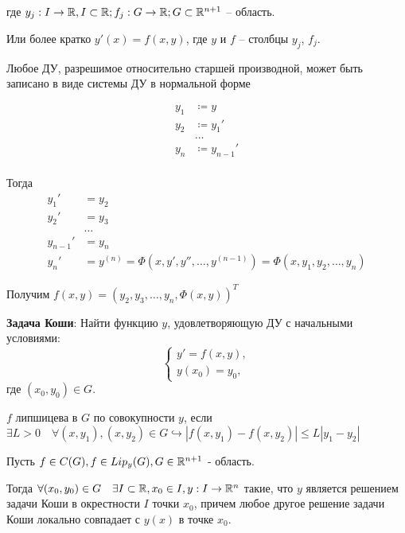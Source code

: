 где $y_j: I \rightarrow \mathbb{R}, I \subset \mathbb{R}; f_j: G \rightarrow \mathbb{R}; G \subset \mathbb{R}^{n+1}$ -- область.

Или более кратко $y'(x) = f(x, y)$, где $y$ и $f$ -- столбцы $y_j$, $f_j$.

\Statement Любое ДУ, разрешимое относительно старшей производной, может быть записано в виде системы ДУ в нормальной форме

\Proof

\begin{align*}
    y_1 &\coloneqq y \\
    y_2 &\coloneqq y_1' \\
    &\dots \\
    y_n &\coloneqq y_ {n-1}' \\
\end{align*}

Тогда
\begin{align*}
    y_1' &= y_2 \\
    y_2' &= y_3 \\
    &\dots \\
    y_{n-1}' &= y_n \\
    y_n' &= y^{(n)} = \Phi(x, y', y'', \dots, y^{(n-1)}) = \Phi(x, y_1, y_2, \dots, y_n)
\end{align*}

Получим $f(x, y) = (y_2, y_3, \dots, y_n, \Phi(x, y))^T$

\Endproof

\Def \textbf{Задача Коши}: Найти функцию $y$, удовлетворяющую ДУ с начальными условиями:
\begin{equation*}
    \begin{cases}
        y' = f(x, y), \\
        y(x_0) = y_0,
    \end{cases}
\end{equation*}
где $(x_0, y_0) \in G$.

\Def $f$ липшицева в $G$ по совокупности $y$, если $\exists L > 0\quad\forall (x, y_1), (x, y_2) \in G \hookrightarrow |f(x, y_1) - f(x, y_2)| \leq L |y_1 - y_2|$


Пусть $f \in C(G), f \in Lip_y(G), G \in \mathbb{R}^{n+1}$ - область.

Тогда $\forall (x_0, y_0) \in G \quad \exists I \subset \mathbb{R}, x_0 \in I, y: I \rightarrow \mathbb{R}^n$ такие, что $y$ является решением задачи Коши в окрестности $I$ точки $x_0$, причем любое другое решение задачи Коши локально совпадает с $y(x)$ в точке $x_0$.



